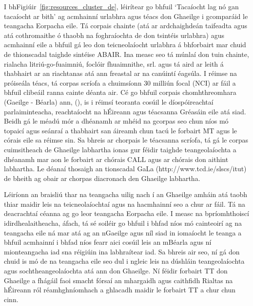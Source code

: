 \begin{multicols}{2}
I bhFigiúir~\ref{fig:resources_cluster_de}, léirítear go bhfuil ‘Tacaíocht lag nó gan tacaíocht ar bith’ ag acmhainní urlabhra agus téacs don Ghaeilge i gcomparáid le teangacha Eorpacha eile. Tá corpais chainte (atá ar ardchaighdeán taifeadta agus atá cothromaithe ó thaobh na foghraíochta de don tsintéis urlabhra) agus acmhainní eile a bhfuil gá leo don teicneolaíocht urlabhra á bhforbairt mar chuid de thionscadal taighde sintéise ABAIR. Ina measc seo tá múnlaí don tuin chainte, rialacha litriú-go-fuaimniú, foclóir fhuaimnithe, srl. agus tá aird ar leith á thabhairt ar an riachtanas atá ann freastal ar na canúintí éagsúla. I réimse na próiseála téacs, tá corpas scríofa a chuimsíonn 30 milliún focal (NCI) ar fáil a bhfuil clibeáil ranna cainte déanta air. Cé go bhfuil corpais chomhthreomhara (Gaeilge - Béarla) ann, (\cite{scannell}), is i réimsí teoranta cosúil le díospóireachtaí parlaiminteacha, reachtaíocht na hÉireann agus téacsanna Gréasáin eile atá siad. Beidh gá le méadú mór a dhéanamh ar mhéid na gcorpas seo chun níos mó topaicí agus seánraí a thabhairt san áireamh chun tacú le forbairt MT agus le córais eile sa réimse sin. Sa bhreis ar chorpais le téacsanna scríofa, tá gá le corpas cuimsitheach de Ghaeilge labhartha ionas gur féidir taighde teangeolaíochta a dhéanamh mar aon le forbairt ar chórais CALL agus ar chórais don aithint labhartha. Le déanaí thosaigh an tionscadal GaLa (http://www.tcd.ie/slscs/itut) de bheith ag obair ar chorpas diacronach den Ghaeilge labhartha.

%

Léiríonn an braisliú thar na teangacha uilig nach í an Ghaeilge amháin atá taobh thiar maidir leis na teicneolaíochtaí agus na hacmhainní seo a chur ar fáil. Tá na deacrachtaí céanna ag go leor teangacha Eorpacha eile. I measc na bpríomhthoiscí idirdhealaitheacha, áfach, tá sé soiléir go bhfuil i bhfad níos mó cainteoirí ag na teangacha eile ná mar atá ag an nGaeilge agus níl siad in iomaíocht le teanga a bhfuil acmhainní i bhfad níos fearr aici cosúil leis an mBéarla agus ní mionteangacha iad sna réigiúin ina labhraítear iad. Sa bhreis air seo, ní gá don chuid is mó de na teangacha eile seo dul i ngleic leis na dúshláin teangeolaíochta agus sochtheangeolaíochta atá ann don Ghaeilge. Ní féidir forbairt TT don Ghaeilge a fhágáil faoi smacht fórsaí an mhargaidh agus caithfidh Rialtas na hÉireann ról réamhghníomhach a ghlacadh maidir le forbairt TT a chur chun cinn.


\end{multicols}
